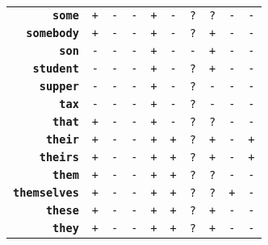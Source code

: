 \documentclass{article}
\begin{document}
\begin{minipage}{\textwidth}
{\begin{tabular}{|r|c|c|c|c|c|c|c|c|c|}
    \textbf{\texttt{some}} & \texttt{+}
    & \texttt{-} & \texttt{-}
    & \texttt{+} & \texttt{-}
    & \texttt{?} & \texttt{?}
    & \texttt{-} & \texttt{-} \\
    \textbf{\texttt{somebody}} & \texttt{+}
    & \texttt{-} & \texttt{-}
    & \texttt{+} & \texttt{-}
    & \texttt{?} & \texttt{+}
    & \texttt{-} & \texttt{-} \\
    \textbf{\texttt{son}} & \texttt{-}
    & \texttt{-} & \texttt{-}
    & \texttt{+} & \texttt{-}
    & \texttt{-} & \texttt{+}
    & \texttt{-} & \texttt{-} \\
    \textbf{\texttt{student}} & \texttt{-}
    & \texttt{-} & \texttt{-}
    & \texttt{+} & \texttt{-}
    & \texttt{?} & \texttt{+}
    & \texttt{-} & \texttt{-} \\
    \textbf{\texttt{supper}} & \texttt{-}
    & \texttt{-} & \texttt{-}
    & \texttt{+} & \texttt{-}
    & \texttt{?} & \texttt{-}
    & \texttt{-} & \texttt{-} \\
    \textbf{\texttt{tax}} & \texttt{-}
    & \texttt{-} & \texttt{-}
    & \texttt{+} & \texttt{-}
    & \texttt{?} & \texttt{-}
    & \texttt{-} & \texttt{-} \\
    \textbf{\texttt{that}} & \texttt{+}
    & \texttt{-} & \texttt{-}
    & \texttt{+} & \texttt{-}
    & \texttt{?} & \texttt{?}
    & \texttt{-} & \texttt{-} \\
    \textbf{\texttt{their}} & \texttt{+}
    & \texttt{-} & \texttt{-}
    & \texttt{+} & \texttt{+}
    & \texttt{?} & \texttt{+}
    & \texttt{-} & \texttt{+} \\
    \textbf{\texttt{theirs}} & \texttt{+}
    & \texttt{-} & \texttt{-}
    & \texttt{+} & \texttt{+}
    & \texttt{?} & \texttt{+}
    & \texttt{-} & \texttt{+} \\
    \textbf{\texttt{them}} & \texttt{+}
    & \texttt{-} & \texttt{-}
    & \texttt{+} & \texttt{+}
    & \texttt{?} & \texttt{?}
    & \texttt{-} & \texttt{-} \\
    \textbf{\texttt{themselves}} & \texttt{+}
    & \texttt{-} & \texttt{-}
    & \texttt{+} & \texttt{+}
    & \texttt{?} & \texttt{?}
    & \texttt{+} & \texttt{-} \\
    \textbf{\texttt{these}} & \texttt{+}
    & \texttt{-} & \texttt{-}
    & \texttt{+} & \texttt{+}
    & \texttt{?} & \texttt{+}
    & \texttt{-} & \texttt{-} \\
    \textbf{\texttt{they}} & \texttt{+}
    & \texttt{-} & \texttt{-}
    & \texttt{+} & \texttt{+}
    & \texttt{?} & \texttt{+}
    & \texttt{-} & \texttt{-} \\

\end{tabular}}
\end{minipage}
\end{document}
